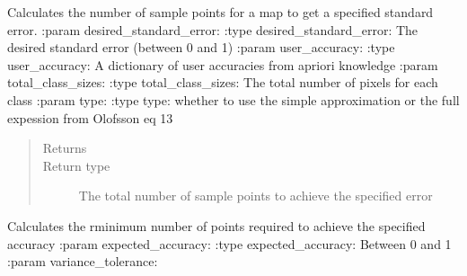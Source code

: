 \documentclass[letterpaper,10pt,english]{sphinxmanual}
\begin{document}
\begin{fulllineitems}
\label{\detokenize{index:pyeo.validation.cal_total_sample_size}}
Calculates the number of sample points for a map to get a specified standard error.
:param desired\_standard\_error:
:type desired\_standard\_error: The desired standard error (between 0 and 1)
:param user\_accuracy:
:type user\_accuracy: A dictionary of user accuracies from apriori knowledge
:param total\_class\_sizes:
:type total\_class\_sizes: The total number of pixels for each class
:param type:
:type type: whether to use the simple approximation or the full expession from Olofsson eq 13
\begin{quote}\begin{description}
\item[{Returns}] \leavevmode


\item[{Return type}] \leavevmode
The total number of sample points to achieve the specified error

\end{description}\end{quote}

\end{fulllineitems}


\begin{fulllineitems}
\label{\detokenize{index:pyeo.validation.calc_minimum_n}}
Calculates the rminimum number of points required to achieve the specified accuracy
:param expected\_accuracy:
:type expected\_accuracy: Between 0 and 1
:param variance\_tolerance:

\end{fulllineitems}

\end{document}
